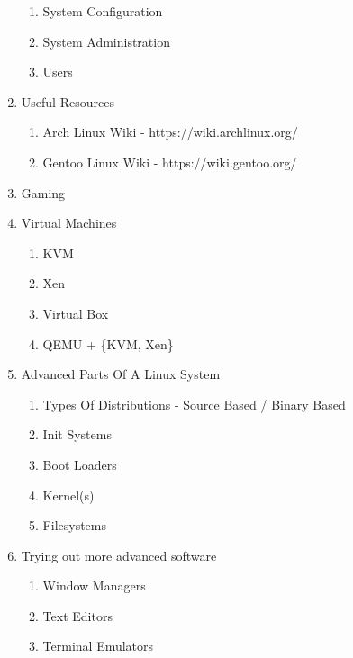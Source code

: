 \documentclass {report}
\begin{document}
\begin{enumerate}
\begin{enumerate}
      \item System Configuration
      \item System Administration
      \item Users
    \end{enumerate}
  \item Useful Resources
    \begin{enumerate}
      \item Arch Linux Wiki - https://wiki.archlinux.org/
      \item Gentoo Linux Wiki - https://wiki.gentoo.org/
    \end{enumerate}
  \item Gaming
  \item Virtual Machines
    \begin{enumerate}
      \item KVM
      \item Xen
      \item Virtual Box
      \item QEMU + \{KVM, Xen\}
    \end{enumerate}
  \item Advanced Parts Of A Linux System
    \begin{enumerate}
      \item Types Of Distributions - Source Based / Binary Based
      \item Init Systems
      \item Boot Loaders
      \item Kernel(s)
      \item Filesystems
    \end{enumerate}
  \item Trying out more advanced software
    \begin{enumerate}
      \item Window Managers
      \item Text Editors
      \item Terminal Emulators
    \end{enumerate}
\end{enumerate}
\end{document}
